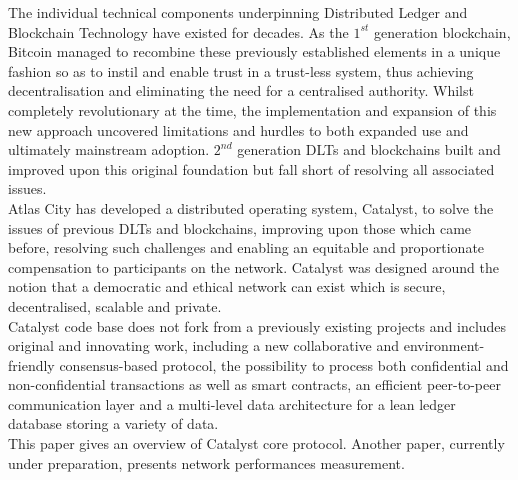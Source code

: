The individual technical components underpinning Distributed Ledger and Blockchain Technology have existed for decades. As the $1^{st}$ generation blockchain, Bitcoin managed to recombine these previously established elements in a unique fashion so as to instil and enable trust in a trust-less system, thus achieving decentralisation and eliminating the need for a centralised authority. Whilst completely revolutionary at the time, the implementation and expansion of this new approach uncovered limitations and hurdles to both expanded use and ultimately mainstream adoption. $2^{nd}$ generation DLTs and blockchains built and improved upon this original foundation but fall short of resolving all associated issues. \\
 
Atlas City has developed a distributed operating system, Catalyst, to solve the issues of previous DLTs and blockchains, improving upon those which came before, resolving such challenges and enabling an equitable and proportionate compensation to participants on the network. Catalyst was designed around the notion that a democratic and ethical network can exist which is secure, decentralised, scalable and private.  \\
 
Catalyst code base does not fork from a previously existing projects and includes original and innovating work, including a new collaborative and environment-friendly consensus-based protocol, the possibility to process both confidential and non-confidential transactions as well as smart contracts, an efficient peer-to-peer communication layer and a multi-level data architecture for a lean ledger database storing a variety of data.\\
 
This paper gives an overview of Catalyst core protocol. Another paper, currently under preparation, presents network performances measurement. 

